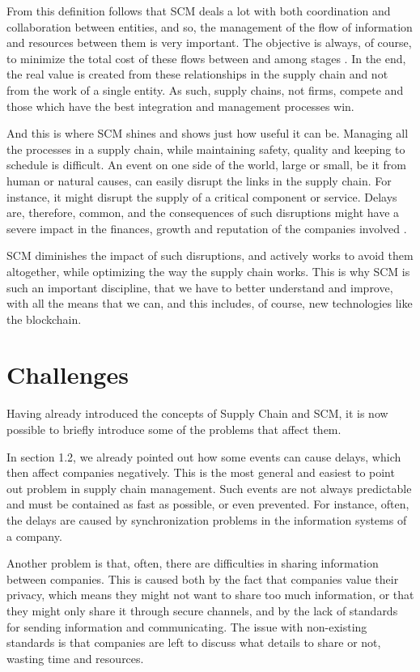 From this definition follows that SCM deals a lot with both coordination and collaboration between entities, and so, the management of the flow of information and resources between them is very important. The objective is always, of course, to minimize the total cost of these flows between and among stages \cite{Habib2011}.
In the end, the real value is created from these relationships in the supply chain and not from the work of a single entity. As such, supply chains, not firms, compete and those which have the best integration and management processes win.
 
And this is where SCM shines and shows just how useful it can be. Managing all the processes in a supply chain, while maintaining safety, quality and keeping to schedule is difficult. An event on one side of the world, large or small, be it from human or natural causes, can easily disrupt the links in the supply chain. For instance, it might disrupt the supply of a critical component or service. Delays are, therefore, common, and the consequences of such disruptions might have a severe impact in the finances, growth and reputation of the companies involved \cite{Punter2013}.

SCM diminishes the impact of such disruptions, and actively works to avoid them altogether, while optimizing the way the supply chain works. This is why SCM is such an important discipline, that we have to better understand and improve, with all the means that we can, and this includes, of course, new technologies like the blockchain.

\section{Challenges}

 Having already introduced the concepts of Supply Chain and SCM, it is now possible to briefly introduce some of the problems that affect them.
    
    In section 1.2, we already pointed out how some events can cause delays, which then affect companies negatively. This is the most general and easiest to point out problem in supply chain management. Such events are not always predictable and must be contained as fast as possible, or even prevented.  For instance, often, the delays are caused by synchronization problems in the information systems of a company.
    
    Another problem is that, often, there are difficulties in sharing information between companies. This is caused both by the fact that companies value their privacy, which means they might not want to share too much information, or that they might only share it through secure channels, and by the lack of standards for sending information and communicating. The issue with non-existing standards is that companies are left to discuss what details to share or not, wasting time and resources.

